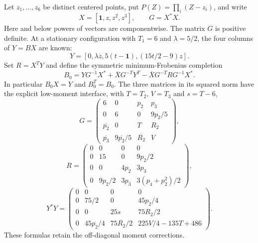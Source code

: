 \documentclass[11pt]{article}
\theoremstyle{remark}
\numberwithin{equation}{section}
\begin{document}
Let $z_1,\ldots,z_6$ be distinct centered points, put
$P(Z)=\prod_i(Z-z_i)$, and write
\[
 X=[\mathbf1,z,z^2,z^3],\qquad G=X^*X.
\]
Here and below powers of vectors are componentwise. The matrix $G$ is
positive definite. At a stationary configuration with $T_1=6$ and
$\lambda=5/2$, the four columns of $Y=BX$ are known:
\begin{equation}\label{eq:oct8-six-B-columns}
 Y=[0,\lambda\overline z,5(t-\mathbf1),
                                    (15t/2-9)z].
\end{equation}
Set $R=X^TY$ and define the symmetric minimum-Frobenius completion
\begin{equation}\label{eq:oct8-six-B-min}
 B_0=YG^{-1}X^*+\overline XG^{-T}Y^T
               -\overline XG^{-T}RG^{-1}X^*.
\end{equation}
In particular $B_0X=Y$ and $B_0^T=B_0$.
The three matrices in its squared norm have the explicit low-moment
interface, with $T=T_2$, $V=T_3$ and $s=T-6$,
\[
 G=\begin{pmatrix}
 6&0&p_2&p_3\\0&6&0&9p_2/5\\
 \overline{p_2}&0&T&R_2\\
 \overline{p_3}&9\overline{p_2}/5&\overline{R_2}&V
 \end{pmatrix},
\]
\[
 R=\begin{pmatrix}
 0&0&0&0\\0&15&0&9p_2/2\\
 0&0&4p_2&3p_3\\0&9p_2/2&3p_3&3(p_4+p_2^2)/2
 \end{pmatrix},
\]
\[
 Y^*Y=\begin{pmatrix}
 0&0&0&0\\0&75/2&0&45p_2/4\\
 0&0&25s&75R_2/2\\
 0&45\overline{p_2}/4&75\overline{R_2}/2&225V/4-135T+486
 \end{pmatrix}.
\]
These formulas retain the off-diagonal moment corrections.
\end{document}
